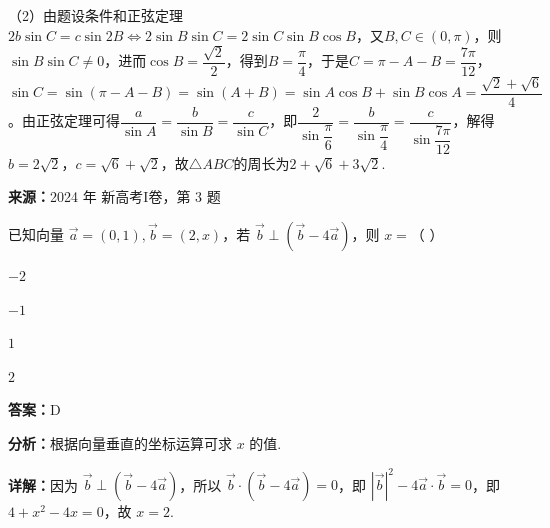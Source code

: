 \begin{question}[points=15]
\begin{solution}
（2）由题设条件和正弦定理$2b\sin C=c\sin2B\Leftrightarrow2\sin B\sin C=2\sin C\sin B\cos B$，又$B,C\in(0,\pi)$，则$\sin B\sin C\neq0$，进而$\cos B=\dfrac{\sqrt{2}}{2}$，得到$B=\dfrac{\pi}{4}$，于是$C=\pi-A-B=\dfrac{7\pi}{12}$，$\sin C=\sin(\pi-A-B)=\sin(A+B)=\sin A\cos B+\sin B\cos A=\dfrac{\sqrt{2}+\sqrt{6}}{4}$。由正弦定理可得$\dfrac{a}{\sin A}=\dfrac{b}{\sin B}=\dfrac{c}{\sin C}$，即$\dfrac{2}{\sin\dfrac{\pi}{6}}=\dfrac{b}{\sin\dfrac{\pi}{4}}=\dfrac{c}{\sin\dfrac{7\pi}{12}}$，解得$b=2\sqrt{2}$，$c=\sqrt{6}+\sqrt{2}$，故$\triangle ABC$的周长为$2+\sqrt{6}+3\sqrt{2}$.
\end{solution}
\end{question}

\begin{question}[points=5]
\textbf{来源：}2024 年 新高考I卷，第 3 题\par
已知向量 $\vec{a}=(0,1), \vec{b}=(2,x)$，若 $\vec{b}\perp(\vec{b}-4\vec{a})$，则 $x=$（ ）
\begin{choices}
  \item $-2$
  \item $-1$
  \item $1$
  \item $2$
\end{choices}
\begin{solution}
\textbf{答案：}D

\textbf{分析：}根据向量垂直的坐标运算可求 $x$ 的值.

\textbf{详解：}因为 $\vec{b}\perp(\vec{b}-4\vec{a})$，所以 $\vec{b}\cdot(\vec{b}-4\vec{a})=0$，即 $|\vec{b}|^2-4\vec{a}\cdot\vec{b}=0$，即 $4+x^2-4x=0$，故 $x=2$.
\end{solution}
\end{question}

